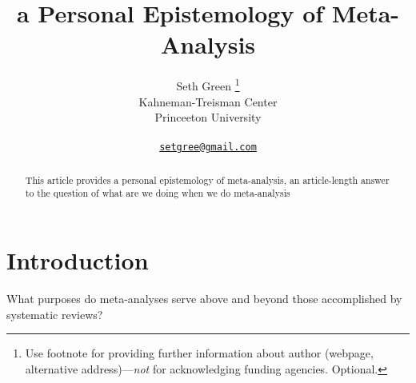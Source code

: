 \documentclass{article}
\title{a Personal Epistemology of Meta-Analysis}
\author{
    Seth Green
    \thanks{Use footnote for providing further information about author
(webpage, alternative address)---\emph{not} for acknowledging funding
agencies. Optional.}
   \\
    Kahneman-Treisman Center \\
    Princeeton University \\
   \\
  \texttt{\href{mailto:setgree@gmail.com}{\nolinkurl{setgree@gmail.com}}} \\
  }
\begin{document}
\maketitle


\begin{abstract}
This article provides a personal epistemology of meta-analysis, an
article-length answer to the question of what are we doing when we do
meta-analysis
\end{abstract}


\section{Introduction}\label{introduction}

What purposes do meta-analyses serve above and beyond those accomplished
by systematic reviews?



\end{document}
